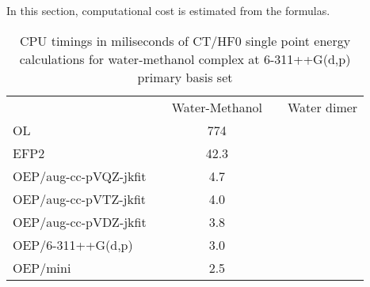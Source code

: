 In this section, computational cost is estimated from the formulas.
%
%
{
\renewcommand{\arraystretch}{1.4}
\begin{table}[h]
\caption[Minimal auxiliary basis set optimized for OEP\hyp{}based CT/HF0 calculations.]
{{\bf}CPU timings in miliseconds of CT/HF0 single point energy calculations
for water-methanol complex at 6-311++G(d,p) primary basis set\footnotemark[1]
}
\label{t:4.oep-costs}
\begin{ruledtabular}
\begin{tabular}{llccc}
                      && Water-Methanol && Water dimer \\
\cline{3-5}
OL                    && 774    &&\\
EFP2                  &&  42.3  &&\\
OEP/aug-cc-pVQZ-jkfit &&   4.7  &&\\
OEP/aug-cc-pVTZ-jkfit &&   4.0  &&\\
OEP/aug-cc-pVDZ-jkfit &&   3.8  &&\\
OEP/6-311++G(d,p)     &&   3.0  &&\\
OEP/mini              &&   2.5  &&\\
\end{tabular}
\end{ruledtabular}
%
%
\end{table}
}
%


